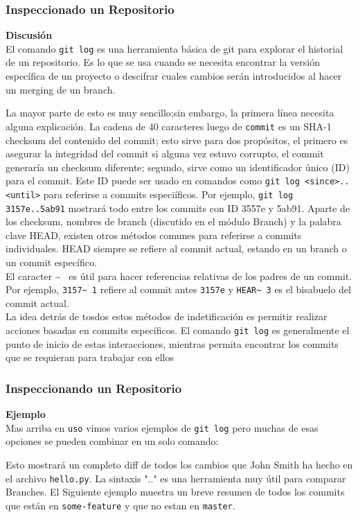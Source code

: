 \documentclass[8pt]{beamer}
\begin{document}
\begin{frame}
\frametitle{Inspeccionado un Repositorio}
\textbf{Discusi\'on}\\
\medskip
El comando \texttt{git log} es una herramienta b\'asica de git para explorar el historial de un repositorio. Es lo que se usa cuando se necesita encontrar la versi\'on espec\'ifica de un proyecto o descifrar cuales cambios ser\'an introducidos al hacer un merging de un branch.

La mayor parte de esto es muy sencillo;sin embargo, la primera l\'inea necesita alguna explicaci\'on. La cadena de 40 caracteres luego de \texttt{commit} es un SHA-1 checksum del contenido del commit; esto sirve para dos prop\'ositos, el primero es asegurar la integridad del commit si alguna vez estuvo corrupto, el commit generar\'ia un checksum diferente; segundo, sirve como un identificador \'unico (ID) para el commit. Este ID puede ser usado en comandos como \texttt{git log <since>..<until>} para referirse a commits especi\'ificos. Por ejemplo, \texttt{git log 3157e..5ab91} mostrar\'a todo entre los commits con ID 3557e y 5ab91. Aparte de los checksum, nombres de branch (discutido en el m\'odulo Branch) y la palabra clave HEAD, existen otros m\'etodos comunes para referirse a commits individuales. HEAD siempre se refiere al commit actual, estando en un branch o un commit espec\'ifico.\\
El caracter \~~ es \'util para hacer referencias relativas de los padres de un commit. Por ejemplo, \texttt{3157\~~1} refiere al commit antes \texttt{3157e} y \texttt{HEAR\~~3} es el bisabuelo del commit actual.\\
La idea detr\'as de tosdos estos m\'etodos de indetificaci\'on es permitir realizar acciones basadas en commits espec\'ificos. El comando \texttt{git log} es generalmente el punto de inicio de estas interacciones, mientras permita encontrar los commits que se requieran para trabajar con ellos
\end{frame}

\begin{frame}
\frametitle{Inspeccionando un Repositorio}
\textbf{Ejemplo}\\
\medskip
Mas arriba en \texttt{uso} vimos varios ejemplos de \texttt{git log} pero muchas de esas opciones se pueden combinar en un solo comando:

Esto mostrar\'a un completo diff de todos los cambios que John Smith ha hecho en el archivo \texttt{hello.py}. La sintaxis ".." es una herramienta muy \'util para comparar Branches. El Siguiente ejemplo muestra un breve resumen de todos los commits que est\'an en \texttt{some-feature} y que no estan en \texttt{master}.


\end{frame}
\end{document}
